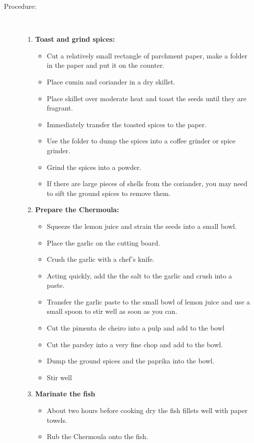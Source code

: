 \documentclass[11pt,letterpaper]{article}
\begin{document}
\begin{description}
\item[Procedure:]\ \\
	\begin{enumerate}
	\item {\bf Toast and grind spices:}
		\begin{itemize}
		\item Cut a relatively small rectangle of parchment paper, make a folder in the paper and put it on the counter.
		\item Place cumin and coriander in a dry skillet.
		\item Place skillet over moderate heat and toast the seeds until they are fragrant.
		\item Immediately transfer the toasted spices to the paper.
		\item Use the folder to dump the spices into a coffee grinder or spice grinder.
		\item Grind the spices into a powder.
		\item If there are large pieces of shells from the coriander, you may need to sift the ground spices to remove them.
		\end{itemize}
	\item {\bf Prepare the Chermoula:}
		\begin{itemize}
		\item Squeeze the lemon juice and strain the seeds into a small bowl.
		\item Place the garlic on the cutting board. 
		\item Crush the garlic with  a chef's knife.
		\item Acting quickly, add the the salt to the garlic and crush into a paste.
		\item Transfer the garlic paste to the small bowl of lemon juice and use a small spoon to stir well as soon as you can.
		\item Cut the pimenta de cheiro into a pulp and add to the bowl
		\item Cut the parsley into a very fine chop and add to the bowl.
		\item Dump the ground spices and the paprika into the bowl.
		\item Stir well
		\end{itemize}
	\item {\bf Marinate the fish}
		\begin{itemize}
		\item About two hours before cooking dry the fish fillets well with paper towels.
		\item Rub the Chermoula onto the fish.

\end{itemize}
\end{enumerate}
\end{description}
\end{document}
